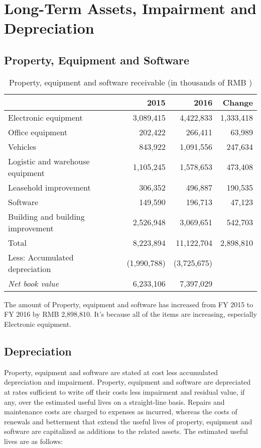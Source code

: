 \section{Long-Term Assets, Impairment and Depreciation} 
\subsection{Property, Equipment and Software}

\begin{table}[H]	
	\begin{center}
		\begin{tabular}{lrrr}
			\toprule
			&\textbf{2015}&\textbf{2016}&\textbf{Change}\\
			\midrule
			Electronic equipment &	3,089,415&	4,422,833&	1,333,418\\
			Office equipment  &	202,422&	266,411&	63,989\\
			Vehicles&	843,922&	1,091,556&	247,634\\
			Logistic and warehouse equipment &	1,105,245&	1,578,653&	473,408\\
			Leasehold improvement&	306,352&	496,887&	190,535\\
			Software& 	149,590&	196,713&	47,123\\
			Building and building improvement & 	2,526,948&	3,069,651&	542,703\\
			Total  &	8,223,894&	11,122,704&	2,898,810\\
			Less: Accumulated depreciation&	(1,990,788)&	(3,725,675)	& \\
			\qquad\emph{Net book value} &	6,233,106&	7,397,029& \\
			\bottomrule
		\end{tabular}
	\end{center}
	\caption{Property, equipment and software receivable (in thousands of RMB \textyen)}\label{table:1}
\end{table}
	
The amount of Property, equipment and software has increased from FY 2015 to FY 2016 by RMB 2,898,810. It’s because all of the items are increasing, especially Electronic equipment.

\subsection{Depreciation}

Property, equipment and software are stated at cost less accumulated depreciation and impairment. Property, equipment and software are depreciated at rates sufficient to write off their costs less impairment and residual value, if any, over the estimated useful lives on a straight-line basis. Repairs and maintenance costs are charged to expenses as incurred, whereas the costs of renewals and betterment that extend the useful lives of property, equipment and software are capitalized as additions to the related assets. The estimated useful lives are as follows:

